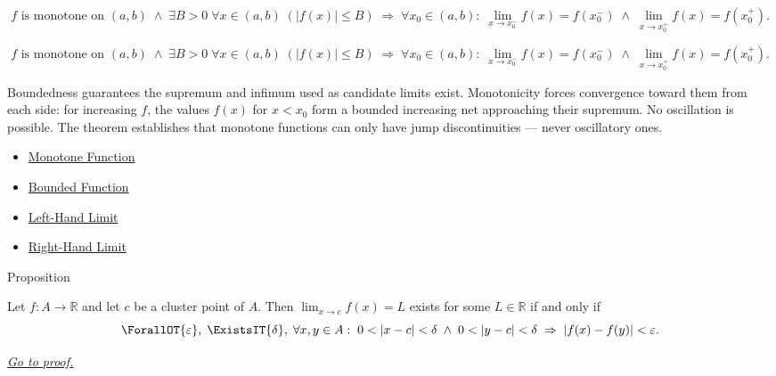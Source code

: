 \begin{remark*}
\[
  f\text{ is monotone on }(a,b)
  \;\wedge\;
  \exists B>0\;\forall x\in(a,b)\;(|f(x)|\leq B)
  \;\Rightarrow\;
  \forall x_0 \in (a,b) :\;
  \lim_{x\to x_0^-}f(x)=f(x_0^-)
  \;\wedge\;
  \lim_{x\to x_0^+}f(x)=f(x_0^+).
\]
\end{remark*}

\begin{remark*}
\[
f\text{ is monotone on }(a,b)
  \;\wedge\;
  \exists B>0\;\forall x\in(a,b)\;(|f(x)|\leq B)
  \;\Rightarrow\;
  \forall x_0 \in (a,b) :\;
  \lim_{x\to x_0^-}f(x)=f(x_0^-)
  \;\wedge\;
  \lim_{x\to x_0^+}f(x)=f(x_0^+).
\]
\end{remark*}

\begin{remark*}[Interpretation]
Boundedness guarantees the supremum and infimum used as candidate
limits exist. Monotonicity forces convergence toward them from each
side: for increasing $f$, the values $f(x)$ for $x < x_0$ form a
bounded increasing net approaching their supremum. No oscillation is
possible. The theorem establishes that monotone functions can only
have jump discontinuities --- never oscillatory ones.
\end{remark*}

\begin{dependencies}
\begin{itemize}
  \item \hyperref[def:function-monotone]{Monotone Function}
  \item \hyperref[def:function-bounded]{Bounded Function}
  \item \hyperref[def:left-hand-limit]{Left-Hand Limit}
  \item \hyperref[def:right-hand-limit]{Right-Hand Limit}
\end{itemize}
\end{dependencies}


\begin{propositionbox}{Proposition}
\begin{proposition}
\label{prop:cauchy-criterion-limits}
Let $f : A \to \mathbb{R}$ and let $c$ be a cluster point of $A$.
Then $\lim_{x\to c}f(x)=L$ exists for some
$L \in \mathbb{R}$ if and only if
\[
  \ForallOT{\varepsilon},\;
  \ExistsIT{\delta},\;
  \forall x, y \in A :\;
  0<|x-c|<\delta
  \;\wedge\;
  0<|y-c|<\delta
  \;\Rightarrow\;
  |f(x)-f(y)|<\varepsilon.
\]

\smallskip\noindent
\hyperref[prf:cauchy-criterion-limits]{\textit{Go to proof.}}
\end{proposition}
\end{propositionbox}

